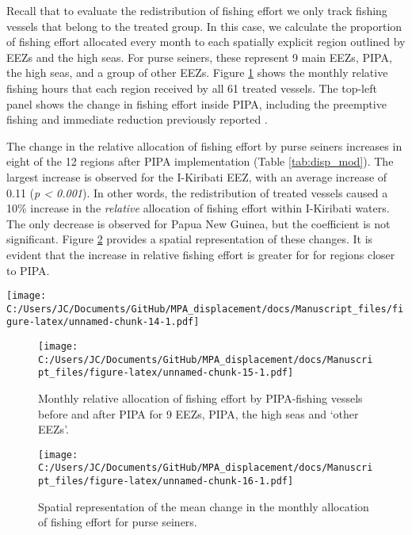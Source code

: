\documentclass[11pt,]{article}
\begin{document}
Recall that to evaluate the redistribution of fishing effort we only
track fishing vessels that belong to the treated group. In this case, we
calculate the proportion of fishing effort allocated every month to each
spatially explicit region outlined by EEZs and the high seas. For purse
seiners, these represent 9 main EEZs, PIPA, the high seas, and a group
of other EEZs. Figure \ref{fig:redist_trend_ps} shows the monthly
relative fishing hours that each region received by all 61 treated
vessels. The top-left panel shows the change in fishing effort inside
PIPA, including the preemptive fishing and immediate reduction
previously reported \citep{mcdermott_2018}.

The change in the relative allocation of fishing effort by purse seiners
increases in eight of the 12 regions after PIPA implementation (Table
\ref{tab:disp_mod}). The largest increase is observed for the I-Kiribati
EEZ, with an average increase of 0.11 (\emph{p \textless{} 0.001}). In
other words, the redistribution of treated vessels caused a 10\%
increase in the \emph{relative} allocation of fishing effort within
I-Kiribati waters. The only decrease is observed for Papua New Guinea,
but the coefficient is not significant. Figure \ref{fig:map_change_ps}
provides a spatial representation of these changes. It is evident that
the increase in relative fishing effort is greater for for regions
closer to PIPA.

\texttt{[image: C:/Users/JC/Documents/GitHub/MPA\_displacement/docs/Manuscript\_files/figure-latex/unnamed-chunk-14-1.pdf]}

\begin{figure}
\centering
\texttt{[image: C:/Users/JC/Documents/GitHub/MPA\_displacement/docs/Manuscript\_files/figure-latex/unnamed-chunk-15-1.pdf]}
\caption{\label{fig:unnamed-chunk-15}\label{fig:redist_trend_ps}Monthly
relative allocation of fishing effort by PIPA-fishing vessels before and
after PIPA for 9 EEZs, PIPA, the high seas and `other EEZs'.}
\end{figure}

\begin{figure}
\centering
\texttt{[image: C:/Users/JC/Documents/GitHub/MPA\_displacement/docs/Manuscript\_files/figure-latex/unnamed-chunk-16-1.pdf]}
\caption{\label{fig:unnamed-chunk-16}\label{fig:map_change_ps}Spatial
representation of the mean change in the monthly allocation of fishing
effort for purse seiners.}
\end{figure}
\end{document}
